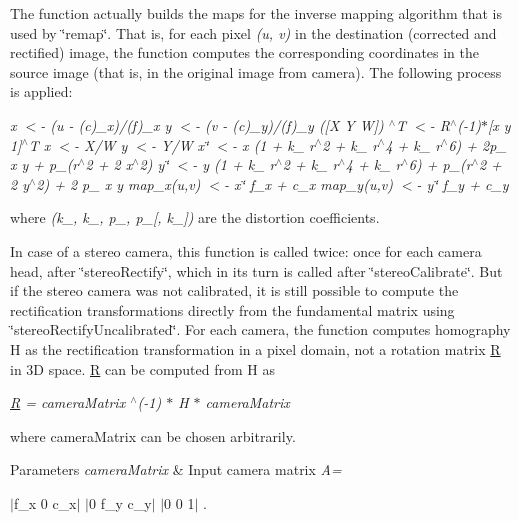 The function actually builds the maps for the inverse mapping algorithm that is used by \char`\"{}remap\char`\"{}. That is, for each pixel {\itshape (u, v)} in the destination (corrected and rectified) image, the function computes the corresponding coordinates in the source image (that is, in the original image from camera). The following process is applied\+:

{\itshape x $<$-\/ (u -\/ (c\textquotesingle{})\+\_\+x)/(f\textquotesingle{})\+\_\+x y $<$-\/ (v -\/ (c\textquotesingle{})\+\_\+y)/(f\textquotesingle{})\+\_\+y (\mbox{[}X Y W\mbox{]}) $^\wedge$T $<$-\/ R$^\wedge$(-\/1)$\ast$\mbox{[}x y 1\mbox{]}$^\wedge$T x\textquotesingle{} $<$-\/ X/W y\textquotesingle{} $<$-\/ Y/W x\char`\"{} $<$-\/ x\textquotesingle{} (1 + k\+\_ r$^\wedge$2 + k\+\_ r$^\wedge$4 + k\+\_ r$^\wedge$6) + 2p\+\_ x\textquotesingle{} y\textquotesingle{} + p\+\_(r$^\wedge$2 + 2 x\textquotesingle{}$^\wedge$2)
y\char`\"{} $<$-\/ y\textquotesingle{} (1 + k\+\_ r$^\wedge$2 + k\+\_ r$^\wedge$4 + k\+\_ r$^\wedge$6) + p\+\_(r$^\wedge$2 + 2 y\textquotesingle{}$^\wedge$2) + 2 p\+\_ x\textquotesingle{} y\textquotesingle{} map\+\_\+x(u,v) $<$-\/ x\char`\"{} f\+\_\+x + c\+\_\+x
map\+\_\+y(u,v) $<$-\/ y\char`\"{} f\+\_\+y + c\+\_\+y }

where {\itshape (k\+\_, k\+\_, p\+\_, p\+\_\mbox{[}, k\+\_\mbox{]})} are the distortion coefficients.

In case of a stereo camera, this function is called twice\+: once for each camera head, after \char`\"{}stereo\+Rectify\char`\"{}, which in its turn is called after \char`\"{}stereo\+Calibrate\char`\"{}. But if the stereo camera was not calibrated, it is still possible to compute the rectification transformations directly from the fundamental matrix using \char`\"{}stereo\+Rectify\+Uncalibrated\char`\"{}. For each camera, the function computes homography {\ttfamily H} as the rectification transformation in a pixel domain, not a rotation matrix {\ttfamily \mbox{\hyperlink{classorg_1_1opencv_1_1_r}{R}}} in 3D space. {\ttfamily \mbox{\hyperlink{classorg_1_1opencv_1_1_r}{R}}} can be computed from {\ttfamily H} as

{\itshape \mbox{\hyperlink{classorg_1_1opencv_1_1_r}{R}} = camera\+Matrix $^\wedge$(-\/1) $\ast$ H $\ast$ camera\+Matrix}

where {\ttfamily camera\+Matrix} can be chosen arbitrarily.


\begin{DoxyParams}{Parameters}
{\em camera\+Matrix} & Input camera matrix {\itshape A= }\\
\hline
\end{DoxyParams}
$\vert$f\+\_\+x 0 c\+\_\+x$\vert$ $\vert$0 f\+\_\+y c\+\_\+y$\vert$ $\vert$0 0 1$\vert$ .

